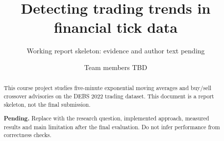 \documentclass[sigconf,nonacm]{acmart}
\title{Detecting trading trends in financial tick data}
\subtitle{Working report skeleton: evidence and author text pending}
\author{Team members TBD}
\affiliation{\institution{Aalto University}\city{Espoo}\country{Finland}}
\newcommand{\pending}[1]{\par\noindent\textbf{Pending.} #1\par}
\begin{document}
\begin{abstract}
This course project studies five-minute exponential moving averages and
buy/sell crossover advisories on the DEBS 2022 trading dataset.
This document is a report skeleton, not the final submission.
\pending{Replace with the research question, implemented approach, measured
results and main limitation after the final evaluation. Do not infer
performance from correctness checks.}
\end{abstract}
\maketitle




\end{document}
